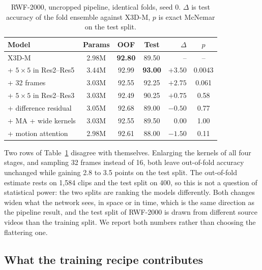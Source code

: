 \documentclass[conference]{IEEEtran}
\begin{document}
\begin{table}[t]
  \centering
  \caption{RWF-2000, uncropped pipeline, identical folds, seed 0. $\Delta$
  is test accuracy of the fold ensemble against X3D-M, $p$ is exact
  McNemar on the test split.}
  \label{tab:modules-clean}
  \setlength{\tabcolsep}{3pt}
  \begin{tabular}{lcccrc}
    \toprule
    Model & Params & OOF & Test & $\Delta$ & $p$ \\
    \midrule
    X3D-M                       & 2.98M & \textbf{92.80} & 89.50 & --      & --     \\
    \;+ $5\times5$ in Res2--Res5 & 3.44M & 92.99 & \textbf{93.00} & $+3.50$ & 0.0043 \\
    \;+ 32 frames               & 3.03M & 92.55 & 92.25 & $+2.75$ & 0.061  \\
    \;+ $5\times5$ in Res2--Res3 & 3.03M & 92.49 & 90.25 & $+0.75$ & 0.58   \\
    \;+ difference residual     & 3.05M & 92.68 & 89.00 & $-0.50$ & 0.77   \\
    \;+ MA + wide kernels       & 3.03M & 92.55 & 89.50 & $0.00$  & 1.00   \\
    \;+ motion attention        & 2.98M & 92.61 & 88.00 & $-1.50$ & 0.11   \\
    \bottomrule
  \end{tabular}
\end{table}

Two rows of Table~\ref{tab:modules-clean} disagree with themselves.
Enlarging the kernels of all four stages, and sampling 32 frames instead
of 16, both leave out-of-fold accuracy unchanged while gaining 2.8 to 3.5
points on the test split. The out-of-fold estimate rests on 1,584 clips
and the test split on 400, so this is not a question of statistical power:
the two splits are ranking the models differently. Both changes widen what
the network sees, in space or in time, which is the same direction as the
pipeline result, and the test split of RWF-2000 is drawn from different
source videos than the training split. We report both numbers rather than
choosing the flattering one.

\subsection{What the training recipe contributes}
\end{document}
